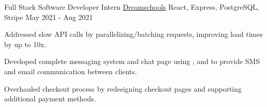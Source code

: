 \begin{cventries}

  \cventry
    {Full Stack Software Developer Intern} %
    {\href{https://dreamschools.com/}{Dreamschools}} %
    {React, Express, PostgreSQL, Stripe} %
    {May 2021 - Aug 2021} %
    {
      \begin{cvitems} %
        \item {Addressed slow  API calls by parallelizing/batching requests, improving load times by up to 10x.}
        \item {Developed complete messaging system and chat page using ,  and  to provide SMS and email communication between clients.}
        \item {Overhauled checkout process by redesigning checkout pages and supporting additional payment methods.}
      \end{cvitems}
    }
\end{cventries}
